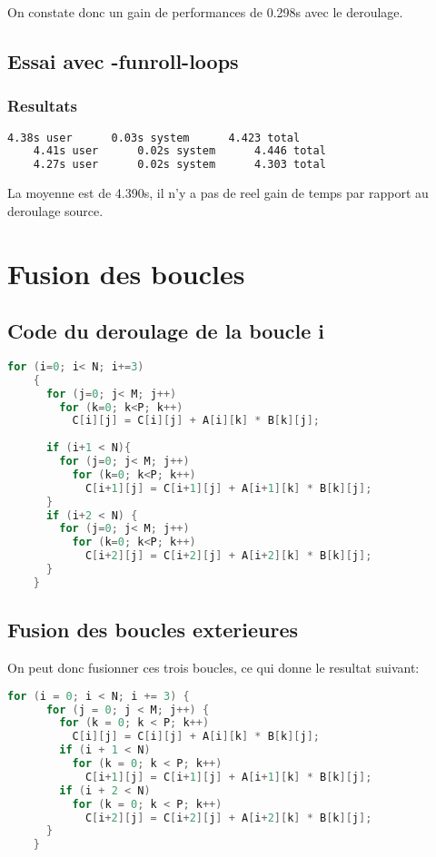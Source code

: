 \documentclass{rapport}
\begin{document}
  On constate donc un gain de performances de 0.298s avec le deroulage.

  \subsection{Essai avec -funroll-loops}
  \subsubsection*{Resultats}
  \begin{lstlisting}[language=sh]
    4.38s user      0.03s system      4.423 total
    4.41s user      0.02s system      4.446 total
    4.27s user      0.02s system      4.303 total
  \end{lstlisting}
  La moyenne est de 4.390s, il n'y a pas de reel gain de temps par rapport au deroulage source.

  \section{Fusion des boucles}
  \subsection{Code du deroulage de la boucle i}
  \begin{lstlisting}[language=C]
    for (i=0; i< N; i+=3)
    {
      for (j=0; j< M; j++)
        for (k=0; k<P; k++)
          C[i][j] = C[i][j] + A[i][k] * B[k][j];
      
      if (i+1 < N){
        for (j=0; j< M; j++)
          for (k=0; k<P; k++)
            C[i+1][j] = C[i+1][j] + A[i+1][k] * B[k][j];
      }
      if (i+2 < N) {
        for (j=0; j< M; j++)
          for (k=0; k<P; k++)
            C[i+2][j] = C[i+2][j] + A[i+2][k] * B[k][j];
      }
    }
  \end{lstlisting}
  \subsection{Fusion des boucles exterieures}
  On peut donc fusionner ces trois boucles, ce qui donne le resultat suivant:
  \begin{lstlisting}[language=C]
    for (i = 0; i < N; i += 3) {
      for (j = 0; j < M; j++) {
        for (k = 0; k < P; k++)
          C[i][j] = C[i][j] + A[i][k] * B[k][j];
        if (i + 1 < N)
          for (k = 0; k < P; k++)
            C[i+1][j] = C[i+1][j] + A[i+1][k] * B[k][j];
        if (i + 2 < N)
          for (k = 0; k < P; k++)
            C[i+2][j] = C[i+2][j] + A[i+2][k] * B[k][j];
      }
    }
  \end{lstlisting}





  
\end{document}
